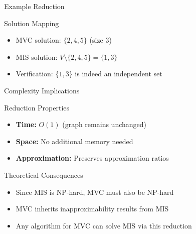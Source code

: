 \documentclass{beamer}
\begin{document}
\begin{frame}{Example Reduction}
    \begin{exampleblock}{Solution Mapping}
        \begin{itemize}
            \item MVC solution: $\{2,4,5\}$ (size 3)
            \item MIS solution: $V \setminus \{2,4,5\} = \{1,3\}$
            \item Verification: $\{1,3\}$ is indeed an independent set
        \end{itemize}
    \end{exampleblock}
\end{frame}


\begin{frame}{Complexity Implications}
    \begin{block}{Reduction Properties}
        \begin{itemize}
            \item \textbf{Time:} $O(1)$ (graph remains unchanged)
            \item \textbf{Space:} No additional memory needed
            \item \textbf{Approximation:} Preserves approximation ratios
        \end{itemize}
    \end{block}
    
    \begin{alertblock}{Theoretical Consequences}
        \begin{itemize}
            \item Since MIS is NP-hard, MVC must also be NP-hard
            \item MVC inherits inapproximability results from MIS
            \item Any algorithm for MVC can solve MIS via this reduction
        \end{itemize}
    \end{alertblock}
    
    
\end{frame}
\end{document}
